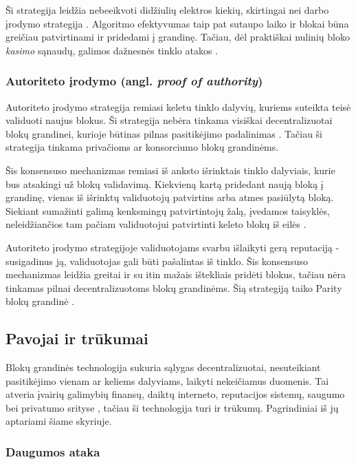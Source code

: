 Ši strategija leidžia nebeeikvoti didžiulių elektros kiekių, skirtingai nei darbo įrodymo strategija \cite{Ethereum}. Algoritmo efektyvumas
taip pat sutaupo laiko ir blokai būna greičiau patvirtinami ir pridedami į grandinę. Tačiau, dėl praktiškai nulinių bloko \textit{kasimo} sąnaudų,
galimos dažnesnės tinklo atakos \cite{Zheng2017}. 

\subsubsection{Autoriteto įrodymo (angl. \textit{proof of authority})}

Autoriteto įrodymo strategija remiasi keletu tinklo dalyvių, kuriems suteikta teisė validuoti naujus blokus. Ši strategija nebėra tinkama visiškai
decentralizuotai blokų grandinei, kurioje būtinas pilnas pasitikėjimo padalinimas \cite{ProofOfAuthority}. Tačiau ši strategija tinkama privačioms
ar konsorciumo blokų grandinėms.

Šis konsensuso mechanizmas remiasi iš anksto išrinktais tinklo dalyviais, kurie bus atsakingi už blokų validavimą. Kiekvieną kartą pridedant naują
bloką į grandinę, vienas iš išrinktų validuotojų patvirtins arba atmes pasiūlytą bloką. Siekiant sumažinti galimą kenksmingų patvirtintojų žalą,
įvedamos taisyklės, neleidžiančios tam pačiam validuotojui patvirtinti keleto blokų iš eilės \cite{ProofOfAuthority}.

Autoriteto įrodymo strategijoje validuotojams svarbu išlaikyti gerą reputaciją - susigadinus ją, validuotojas gali būti pašalintas iš tinklo. Šis konsensuso mechanizmas
leidžia greitai ir su itin mažais ištekliais pridėti blokus, tačiau nėra tinkamas pilnai decentralizuotoms blokų grandinėms. Šią strategiją
taiko Parity blokų grandinė \cite{ProofOfAuthority}.

\subsection{Pavojai ir trūkumai}

Blokų grandinės technologija sukuria sąlygas decentralizuotai, nesuteikiant pasitikėjimo vienam ar keliems dalyviams, laikyti nekeičiamus duomenis.
Tai atveria įvairių galimybių finansų, daiktų interneto, reputacijos sistemų, saugumo bei privatumo srityse \cite{Zheng2017}, tačiau ši technologija turi ir trūkumų.
Pagrindiniai iš jų aptariami šiame skyriuje.

\subsubsection{Daugumos ataka}

